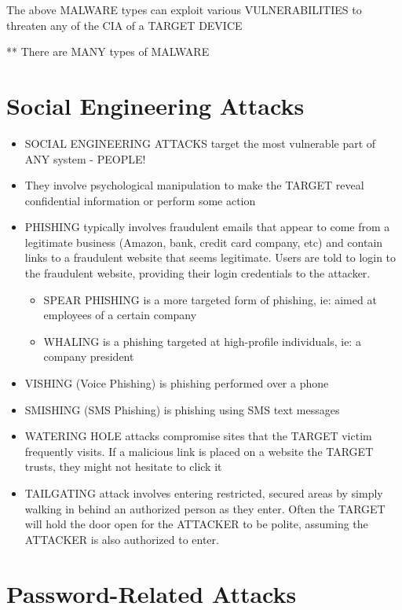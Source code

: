 The above MALWARE types can exploit various VULNERABILITIES to threaten
any of the CIA of a TARGET DEVICE

** There are MANY types of MALWARE

\section{Social Engineering Attacks}\label{social-engineering-attacks}

\begin{itemize}
\item
  SOCIAL ENGINEERING ATTACKS target the most vulnerable part of ANY
  system - PEOPLE!
\item
  They involve psychological manipulation to make the TARGET reveal
  confidential information or perform some action
\item
  PHISHING typically involves fraudulent emails that appear to come from
  a legitimate business (Amazon, bank, credit card company, etc) and
  contain links to a fraudulent website that seems legitimate. Users are
  told to login to the fraudulent website, providing their login
  credentials to the attacker.

  \begin{itemize}
  \tightlist
  \item
    SPEAR PHISHING is a more targeted form of phishing, ie: aimed at
    employees of a certain company
  \item
    WHALING is a phishing targeted at high-profile individuals, ie: a
    company president
  \end{itemize}
\item
  VISHING (Voice Phishing) is phishing performed over a phone
\item
  SMISHING (SMS Phishing) is phishing using SMS text messages
\item
  WATERING HOLE attacks compromise sites that the TARGET victim
  frequently visits. If a malicious link is placed on a website the
  TARGET trusts, they might not hesitate to click it
\item
  TAILGATING attack involves entering restricted, secured areas by
  simply walking in behind an authorized person as they enter. Often the
  TARGET will hold the door open for the ATTACKER to be polite, assuming
  the ATTACKER is also authorized to enter.
\end{itemize}

\section{Password-Related Attacks}\label{password-related-attacks}

